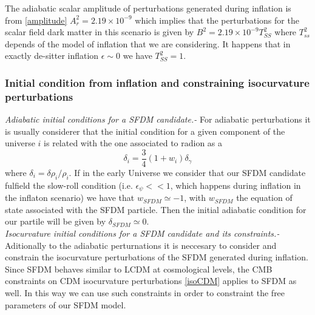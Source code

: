 \documentclass[amssymb,twocolumn,prd,nofootinbib,showpacs]{revtex4-1}
\begin{document}
The adiabatic scalar amplitude of perturbations generated during inflation is from \eqref{amplitude} 
$A_r^2=2.19\times 10^{-9}
$ which implies that the perturbations for the scalar field dark matter in this scenario is given by $B^2=2.19\times 10^{-9}T_{SS}^2$ where $T_{ss}^2$ depends of the model of inflation that we are considering. It happens that in exactly de-sitter inflation $\epsilon\sim 0$ we have $T_{SS}^2=1$. 

\subsubsection{Initial condition from inflation and constraining isocurvature perturbations}
\textit{Adiabatic initial conditions for a SFDM candidate.-} For adiabatic perturbations it is usually considerer that the initial condition for a given component of the universe $i$ is related with the one associated to radion as \cite{Liddle,princ_ad,princ_ad2}a
\begin{equation}
\delta_i = \frac{3}{4}(1+w_i)\delta_\gamma
\end{equation}
where $\delta_i = \delta\rho_i/\rho_i$. If in the early Universe we consider that our SFDM candidate fulfield the slow-roll condition (i.e. $\epsilon_\psi<<1$, which happens during inflation in the inflaton scenario) we have that $w_{SFDM}\simeq -1$, with $w_{SFDM}$ the equation of state associated with the SFDM particle. Then the initial adiabatic condition for our partile will be given by $\delta_{SFDM}\simeq 0$.\\

\textit{Isocurvature initial conditions for a SFDM candidate and its constraints.-} Aditionally to the adiabatic perturnations it is neccesary to consider and constrain the isocurvature perturbations of the SFDM generated during inflation. 
Since SFDM behaves similar to LCDM at cosmological levels, the CMB constraints on CDM isocurvature perturbations \eqref{isoCDM} applies to SFDM as well. In this way we can use such constraints in order to constraint the free parameters of our SFDM model.\\
\end{document}
